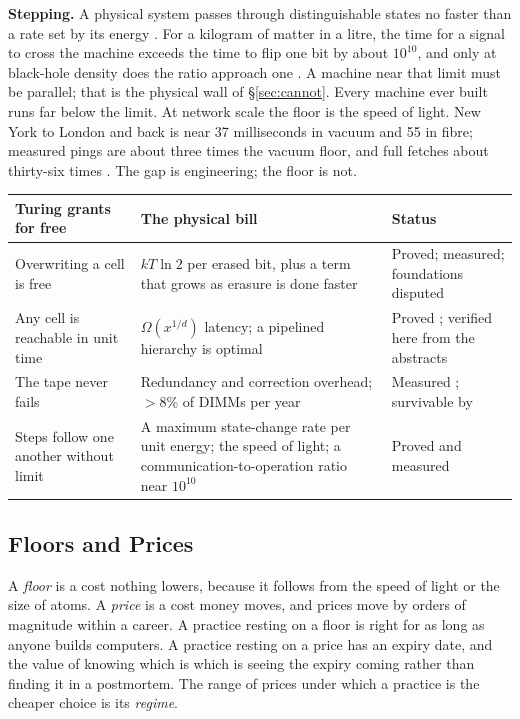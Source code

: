 \documentclass[11pt,oneside]{article}
\theoremstyle{definition}
\theoremstyle{remark}
\begin{document}
\textbf{Stepping.} A physical system passes through distinguishable states no faster than
a rate set by its energy \cite{margolus1998}. For a kilogram of matter in a litre, the time
for a signal to cross the machine exceeds the time to flip one bit by about $10^{10}$, and
only at black-hole density does the ratio approach one \cite{lloyd2000}. A machine near
that limit must be parallel; that is the physical wall of \S\ref{sec:cannot}. Every machine
ever built runs far below the limit. At network scale the floor is the speed of light. New York to London and back is
near 37 milliseconds in vacuum and 55 in fibre; measured pings are about three times the
vacuum floor, and full fetches about thirty-six times \cite{bozkurt2017}. The gap is
engineering; the floor is not.

\begin{center}
\small
\begin{longtable}{@{}p{}p{}p{}@{}}
\toprule
\textbf{Turing grants for free} & \textbf{The physical bill} & \textbf{Status} \\
\midrule
\endhead
Overwriting a cell is free & $kT\ln 2$ per erased bit, plus a term that grows as erasure is
done faster & Proved; measured; foundations disputed \\
\addlinespace
Any cell is reachable in unit time & $\Omega(x^{1/d})$ latency; a pipelined hierarchy is
optimal & Proved \cite{bilardi2009}; verified here from the abstracts \\
\addlinespace
The tape never fails & Redundancy and correction overhead; $>8\%$ of DIMMs per year &
Measured \cite{schroeder2009}; survivable by \cite{vonneumann1956} \\
\addlinespace
Steps follow one another without limit & A maximum state-change rate per unit energy; the
speed of light; a communication-to-operation ratio near $10^{10}$ & Proved and measured
\cite{margolus1998,lloyd2000} \\
\bottomrule
\end{longtable}
\end{center}



\subsection{Floors and Prices}\label{sec:floors}

A \emph{floor} is a cost nothing lowers, because it follows from the speed of light or the
size of atoms. A \emph{price} is a cost money moves, and prices move by orders of magnitude
within a career. A practice resting on a floor is right for as long as anyone builds
computers. A practice resting on a price has an expiry date, and the value of knowing
which is which is seeing the expiry coming rather than finding it in a postmortem. The
range of prices under which a practice is the cheaper choice is its \emph{regime}.
\end{document}
